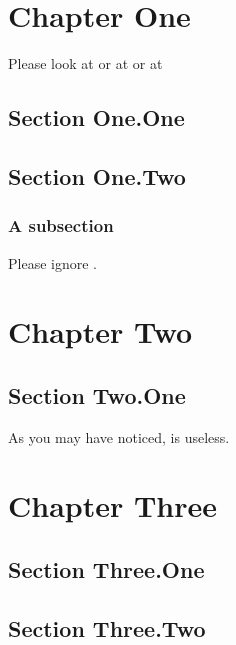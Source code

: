 \documentclass{book}
\begin{document}
\chapter{Chapter One}
  Please look at  or at  or at 


  \section{Section One.One}
  \label{mysection}
  \lipsum




  \section{Section One.Two}

  \subsection{A subsection} \label{foosubsection}
  Please ignore .
  
  \chapter{Chapter Two}
  \section{Section Two.One}

  As you may have noticed,  is useless.
  

  \chapter{Chapter Three}
  \section{Section Three.One}   %
  \section{Section Three.Two}\label{othersection}
\end{document}
